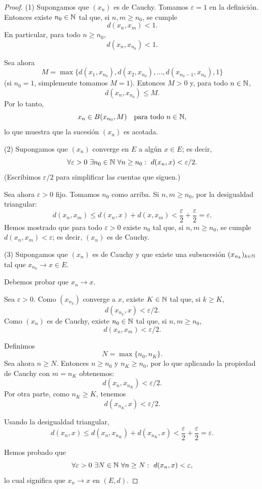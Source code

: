 \begin{proof}
(1) Supongamos que $(x_n)$ es de Cauchy. Tomamos $\varepsilon = 1$ en la
definición. Entonces existe $n_0 \in \mathbb{N}$ tal que, si $n,m \ge n_0$, se cumple
\[
d(x_n,x_m) < 1.
\]
En particular, para todo $n \ge n_0$,
\[
d(x_n,x_{n_0}) < 1.
\]

Sea ahora
\[
M = \max\bigl\{d(x_1,x_{n_0}), d(x_2,x_{n_0}), \dots, d(x_{n_0-1},x_{n_0}), 1\bigr\}
\]
(si $n_0=1$, simplemente tomamos $M=1$). Entonces $M>0$ y, para todo
$n \in \mathbb{N}$,
\[
d(x_n,x_{n_0}) \le M.
\]
Por lo tanto,
\[
x_n \in B(x_{n_0},M) \quad \text{para todo } n \in \mathbb{N},
\]
lo que muestra que la sucesión $(x_n)$ es acotada.

\medskip

(2) Supongamos que $(x_n)$ converge en $E$ a algún $x \in E$; es decir,
\[
\forall \varepsilon>0\ \exists n_0 \in \mathbb{N}\ \forall n \ge n_0:
\ d(x_n,x) < \varepsilon/2.
\]
(Escribimos $\varepsilon/2$ para simplificar las cuentas que siguen.)

Sea ahora $\varepsilon>0$ fijo. Tomamos $n_0$ como arriba.
Si $n,m \ge n_0$, por la desigualdad triangular:
\[
d(x_n,x_m) \le d(x_n,x) + d(x,x_m) < \frac{\varepsilon}{2} + \frac{\varepsilon}{2}
= \varepsilon.
\]
Hemos mostrado que para todo $\varepsilon>0$ existe $n_0$ tal que,
si $n,m \ge n_0$, se cumple $d(x_n,x_m) < \varepsilon$; es decir,
$(x_n)$ es de Cauchy.

\medskip

(3) Supongamos que $(x_n)$ es de Cauchy y que existe una subsucesión
$(x_{n_k})_{k\in\mathbb{N}}$ tal que $x_{n_k} \to x \in E$.

Debemos probar que $x_n \to x$.

Sea $\varepsilon>0$. Como $(x_{n_k})$ converge a $x$, existe $K \in \mathbb{N}$ tal que,
si $k \ge K$,
\[
d(x_{n_k},x) < \varepsilon/2.
\]
Como $(x_n)$ es de Cauchy, existe $n_0 \in \mathbb{N}$ tal que, si $n,m \ge n_0$,
\[
d(x_n,x_m) < \varepsilon/2.
\]

Definimos
\[
N = \max\{n_0, n_K\}.
\]
Sea ahora $n \ge N$. Entonces $n \ge n_0$ y $n_K \ge n_0$, por lo que
aplicando la propiedad de Cauchy con $m = n_K$ obtenemos:
\[
d(x_n,x_{n_K}) < \varepsilon/2.
\]
Por otra parte, como $n_K \ge K$, tenemos
\[
d(x_{n_K},x) < \varepsilon/2.
\]

Usando la desigualdad triangular,
\[
d(x_n,x) \le d(x_n,x_{n_K}) + d(x_{n_K},x)
< \frac{\varepsilon}{2} + \frac{\varepsilon}{2} = \varepsilon.
\]

Hemos probado que
\[
\forall \varepsilon>0\ \exists N \in \mathbb{N}\ \forall n \ge N:\ d(x_n,x) < \varepsilon,
\]
lo cual significa que $x_n \to x$ en $(E,d)$.
\end{proof}

